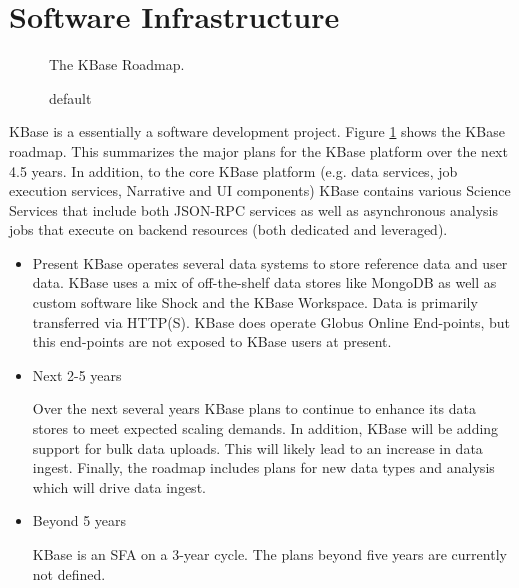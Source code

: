 \documentclass[10pt,a4paper]{report}
\begin{document}
\section{Software Infrastructure}
\begin{figure}[htbp]
\begin{center}

\caption{default}
\label{kbase:roadmap} The KBase Roadmap.
\end{center}
\end{figure}

KBase is a essentially a software development project.  Figure \ref{kbase:roadmap} shows the KBase roadmap.  This summarizes the major plans for the KBase platform over the next 4.5 years.  In addition, to the core KBase platform (e.g. data services, job execution services, Narrative and UI components) KBase contains various Science Services that include both JSON-RPC services as well as asynchronous analysis jobs that execute on backend resources (both dedicated and leveraged).

\begin{itemize}
\item Present
KBase operates several data systems to store reference data and user data.  KBase uses a mix of off-the-shelf data stores like MongoDB as well as custom software like Shock and the KBase Workspace.  Data is primarily transferred via HTTP(S). KBase does operate Globus Online End-points, but this end-points are not exposed to KBase users at present.


\item Next 2-5 years

Over the next several years KBase plans to continue to enhance its data stores to meet expected scaling demands.  In addition, KBase will be adding support for bulk data uploads.  This will likely lead to an increase in data ingest.  Finally, the roadmap includes plans for new data types and analysis which will drive data ingest.

\item Beyond 5 years

KBase is an SFA on a 3-year cycle.  The plans beyond five years are currently not defined.
\end{itemize}
\end{document}
